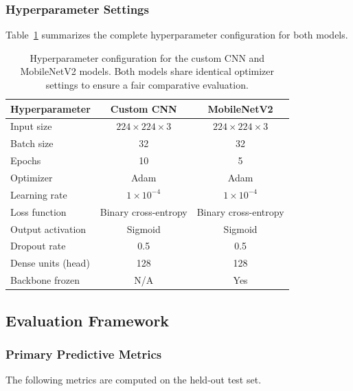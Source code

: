\documentclass[preprint,12pt]{elsarticle}
\begin{document}
\subsubsection{Hyperparameter Settings}
Table~\ref{tab:Hyperparams} summarizes the complete hyperparameter
configuration for both models.

\begin{table}[!ht]
\centering
\caption{Hyperparameter configuration for the custom CNN and
MobileNetV2 models. Both models share identical optimizer settings
to ensure a fair comparative evaluation.}
\label{tab:Hyperparams}
\begin{tabular}{|l|c|c|}
\hline
\textbf{Hyperparameter} & \textbf{Custom CNN} & \textbf{MobileNetV2} \\
\hline
Input size              & $224 \times 224 \times 3$ & $224 \times 224 \times 3$ \\
Batch size              & 32        & 32        \\
Epochs                  & 10        & 5         \\
Optimizer               & Adam      & Adam      \\
Learning rate           & $1\times10^{-4}$ & $1\times10^{-4}$ \\
Loss function           & Binary cross-entropy & Binary cross-entropy \\
Output activation       & Sigmoid   & Sigmoid   \\
Dropout rate            & 0.5       & 0.5       \\
Dense units (head)      & 128       & 128       \\
Backbone frozen         & N/A       & Yes       \\
\hline
\end{tabular}
\end{table}

\subsection{Evaluation Framework}

\subsubsection{Primary Predictive Metrics}
The following metrics are computed on the held-out test set.
\end{document}
